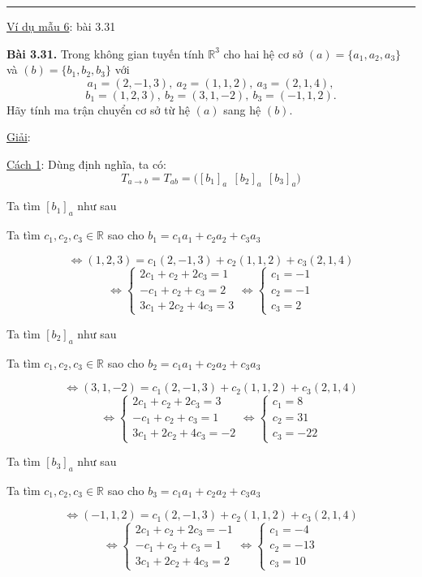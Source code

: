 \documentclass[12pt,a4paper]{article}
\newcommand{\R}{\mathbb{R}}
\begin{document}
\noindent\rule{\linewidth}{0.4pt}

\noindent\underline{Ví dụ mẫu 6}: bài 3.31

\medskip
\noindent\textbf{Bài 3.31.} Trong không gian tuyến tính $\R^3$ cho hai hệ cơ sở $(a)=\{a_1,a_2,a_3\}$ và $(b)=\{b_1,b_2,b_3\}$ với
\[
a_1=(2,-1,3),\ a_2=(1,1,2),\ a_3=(2,1,4),
\]
\[
b_1=(1,2,3),\ b_2=(3,1,-2),\ b_3=(-1,1,2).
\]
Hãy tính ma trận chuyển cơ sở từ hệ $(a)$ sang hệ $(b)$.

\medskip
\noindent\underline{Giải}:

\noindent\underline{Cách 1}: Dùng định nghĩa, ta có:
\[
T_{a\to b}=T_{ab}=\big([b_1]_a \ \ [b_2]_a \ \ [b_3]_a\big)
\]

Ta tìm $[b_1]_a$ như sau

Ta tìm $c_1,c_2,c_3\in\R$ sao cho $b_1=c_1a_1+c_2a_2+c_3a_3$

\[
\Leftrightarrow (1,2,3)=c_1(2,-1,3)+c_2(1,1,2)+c_3(2,1,4)
\]
\[
\Leftrightarrow
\begin{cases}
2c_1+c_2+2c_3=1\\
-c_1+c_2+c_3=2\\
3c_1+2c_2+4c_3=3
\end{cases}
\Leftrightarrow
\begin{cases}
c_1=-1\\
c_2=-1\\
c_3=2
\end{cases}
\]

Ta tìm $[b_2]_a$ như sau

Ta tìm $c_1,c_2,c_3\in\R$ sao cho $b_2=c_1a_1+c_2a_2+c_3a_3$

\[
\Leftrightarrow (3,1,-2)=c_1(2,-1,3)+c_2(1,1,2)+c_3(2,1,4)
\]
\[
\Leftrightarrow
\begin{cases}
2c_1+c_2+2c_3=3\\
-c_1+c_2+c_3=1\\
3c_1+2c_2+4c_3=-2
\end{cases}
\Leftrightarrow
\begin{cases}
c_1=8\\
c_2=31\\
c_3=-22
\end{cases}
\]

Ta tìm $[b_3]_a$ như sau

Ta tìm $c_1,c_2,c_3\in\R$ sao cho $b_3=c_1a_1+c_2a_2+c_3a_3$

\[
\Leftrightarrow (-1,1,2)=c_1(2,-1,3)+c_2(1,1,2)+c_3(2,1,4)
\]
\[
\Leftrightarrow
\begin{cases}
2c_1+c_2+2c_3=-1\\
-c_1+c_2+c_3=1\\
3c_1+2c_2+4c_3=2
\end{cases}
\Leftrightarrow
\begin{cases}
c_1=-4\\
c_2=-13\\
c_3=10
\end{cases}
\]
\end{document}
